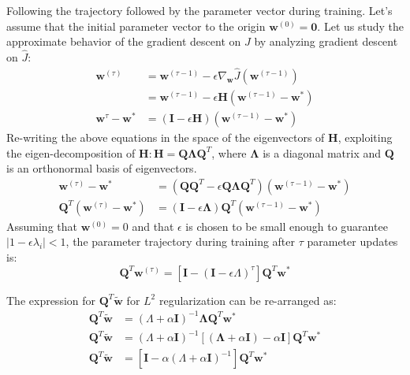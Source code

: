 \documentclass[fleqn]{article}
\begin{document}
Following the trajectory followed by the parameter vector during training. Let's assume that the initial parameter vector to the origin $\bm{w}^{(0)} = \bm{0}$. Let us study the approximate behavior of the gradient descent on $J$ by analyzing gradient descent on $\hat{J}$:
\begin{align*}
\bm{w}^{(\tau)} &= \bm{w}^{(\tau - 1)} - \epsilon \nabla_{\bm{w}} \hat{J}(\bm{w}^{(\tau - 1)})\\
&=  \bm{w}^{(\tau - 1)} - \epsilon \bm{H} (\bm{w}^{(\tau - 1)} - \bm{w}^*) \\
\bm{w}^{\tau} - \bm{w^*} &= (\bm{I} - \epsilon \bm{H})(\bm{w}^{(\tau - 1)} - \bm{w}^*)
\end{align*}
Re-writing the above equations in the space of the eigenvectors of $\bm{H}$, exploiting the eigen-decomposition of $\bm{H} : \bm{H} = \bm{Q \Lambda} \bm{Q}^T$, where $\bm{\Lambda}$ is a diagonal matrix and $\bm{Q}$ is an orthonormal basis of eigenvectors.
\begin{align*}
	\bm{w}^{(\tau)} - \bm{w^*} &= (\bm{Q}\bm{Q}^T - \epsilon \bm{Q \Lambda} \bm{Q}^T)(\bm{w}^{(\tau -1)} - \bm{w^*})\\
	\bm{Q}^T (\bm{w}^{(\tau)} - \bm{w^*}) &= (\bm{I} - \epsilon \bm{\Lambda})\bm{Q}^T(\bm{w}^{(\tau -1)} - \bm{w^*})
\end{align*}
Assuming that $\bm{w}^{(0)} = 0$ and that $\epsilon$ is chosen to be small enough to guarantee $|1 - \epsilon \lambda_i | < 1$, the parameter trajectory during training after $\tau$ parameter updates is:
\begin{equation} \label{early_stopping}
	\bm{Q}^T\bm{w}^{(\tau)} = [\bm{I} - (\bm{I} - \epsilon \Lambda)^{\tau}]\bm{Q}^T \bm{w}^*
\end{equation}

The expression for $\bm{Q}^T \bm{\tilde{w}}$ for $L^2$ regularization can be re-arranged as:
\begin{align}
	\bm{Q}^T\bm{\tilde{w}} &= (\Lambda + \alpha \bm{I})^{-1} \bm{\Lambda}\bm{Q}^T \bm{w^*} \nonumber \\
	\bm{Q}^T\bm{\tilde{w}} &= (\Lambda + \alpha \bm{I})^{-1} [(\bm{\Lambda} + \alpha \bm{I}) - \alpha \bm{I}]\bm{Q}^T \bm{w^*} \nonumber \\
	\bm{Q}^T\bm{\tilde{w}} &=  [\bm{I}- \alpha (\Lambda + \alpha \bm{I})^{-1}]\bm{Q}^T \bm{w^*} \label{l2_equation}\\
\end{align}
\end{document}
